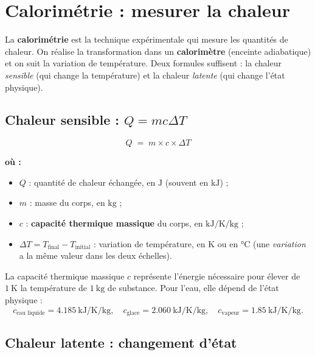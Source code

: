\documentclass[11pt,a4paper]{article}
\newenvironment{ou}{%
  \par\smallskip\noindent\textbf{où :}\nopagebreak
  \begin{itemize}[leftmargin=1.8em,topsep=2pt,itemsep=1.5pt,parsep=0pt]}%
  {\end{itemize}}
\begin{document}
\section{Calorimétrie : mesurer la chaleur}
La \textbf{calorimétrie} est la technique expérimentale qui mesure les quantités de chaleur. On réalise
la transformation dans un \textbf{calorimètre} (enceinte adiabatique) et on suit la variation de
température. Deux formules suffisent : la chaleur \emph{sensible} (qui change la température) et la
chaleur \emph{latente} (qui change l'état physique).

\subsection{Chaleur sensible : $Q = mc\Delta T$}

\begin{formule}
\[ \boxed{\;Q \;=\; m \times c \times \Delta T\;} \]
\begin{ou}
  \item $Q$ : quantité de chaleur échangée, en $\si{\joule}$ (souvent en $\si{\kilo\joule}$) ;
  \item $m$ : masse du corps, en $\si{\kilogram}$ ;
  \item $c$ : \textbf{capacité thermique massique} du corps, en $\si{\kilo\joule\per\kelvin\per\kilogram}$ ;
  \item $\Delta T = T_{\text{final}} - T_{\text{initial}}$ : variation de température, en $\si{\kelvin}$ ou en $\si{\celsius}$
        (une \emph{variation} a la même valeur dans les deux échelles).
\end{ou}
\end{formule}

\begin{remarque}
La capacité thermique massique $c$ représente l'énergie nécessaire pour élever de $\SI{1}{\kelvin}$ la
température de $\SI{1}{\kilogram}$ de substance. Pour l'eau, elle dépend de l'état physique :
\[ c_{\text{eau liquide}} = \SI{4.185}{\kilo\joule\per\kelvin\per\kilogram},\quad
   c_{\text{glace}} = \SI{2.060}{\kilo\joule\per\kelvin\per\kilogram},\quad
   c_{\text{vapeur}} = \SI{1.85}{\kilo\joule\per\kelvin\per\kilogram}. \]
\end{remarque}

\subsection{Chaleur latente : changement d'état}
\end{document}
